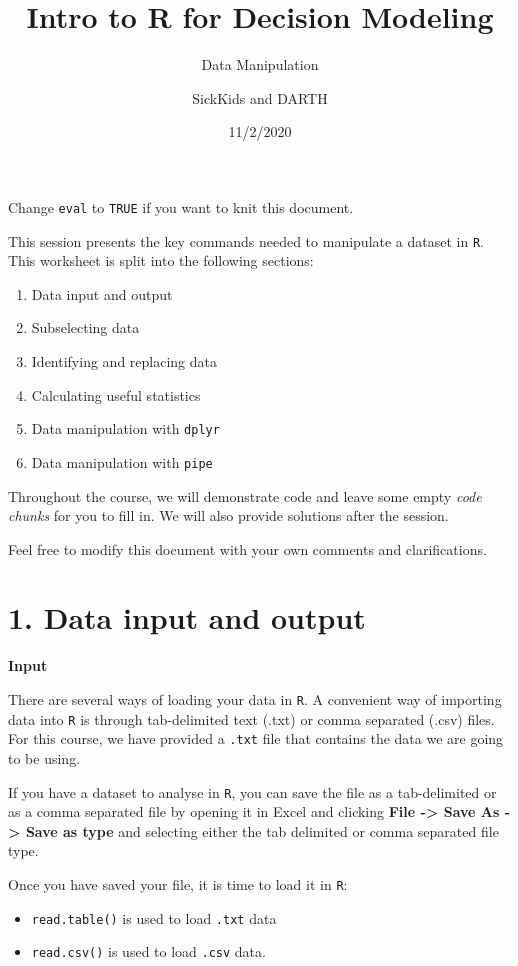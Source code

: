 \documentclass[
]{article}
\title{Intro to R for Decision Modeling}
\subtitle{Data Manipulation}
\author{SickKids and DARTH}
\date{11/2/2020}
\providecommand{\tightlist}{%
  \setlength{\itemsep}{0pt}\setlength{\parskip}{0pt}}
\begin{document}
\maketitle

Change \texttt{eval} to \texttt{TRUE} if you want to knit this document.

This session presents the key commands needed to manipulate a dataset in
\texttt{R}. This worksheet is split into the following sections:

\begin{enumerate}
\def\labelenumi{\arabic{enumi}.}
\item
  Data input and output
\item
  Subselecting data
\item
  Identifying and replacing data
\item
  Calculating useful statistics
\item
  Data manipulation with \texttt{dplyr}
\item
  Data manipulation with \texttt{pipe}
\end{enumerate}

Throughout the course, we will demonstrate code and leave some empty
\emph{code chunks} for you to fill in. We will also provide solutions
after the session.

Feel free to modify this document with your own comments and
clarifications.

\hypertarget{data-input-and-output}{%
\section{1. Data input and output}\label{data-input-and-output}}

\textbf{Input}

There are several ways of loading your data in \texttt{R}. A convenient
way of importing data into \texttt{R} is through tab-delimited text
(.txt) or comma separated (.csv) files. For this course, we have
provided a \texttt{.txt} file that contains the data we are going to be
using.

If you have a dataset to analyse in \texttt{R}, you can save the file as
a tab-delimited or as a comma separated file by opening it in Excel and
clicking \textbf{File -\textgreater{} Save As -\textgreater{} Save as
type} and selecting either the tab delimited or comma separated file
type.

Once you have saved your file, it is time to load it in \texttt{R}:

\begin{itemize}
\tightlist
\item
  \texttt{read.table()} is used to load \texttt{.txt} data
\item
  \texttt{read.csv()} is used to load \texttt{.csv} data.
\end{itemize}
\end{document}
